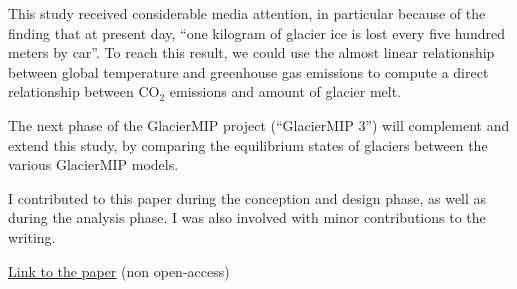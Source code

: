 This study received considerable media attention, in particular because of the finding that at present day,
“one kilogram of glacier ice is lost every five hundred meters by car”. To reach this result, we could use
the almost linear relationship between global temperature and greenhouse gas emissions
to compute a direct relationship between CO\(_2\) emissions and amount of glacier melt.

The next phase of the GlacierMIP project (“GlacierMIP 3”) will complement and extend this study, by comparing
the equilibrium states of glaciers between the various GlacierMIP models.

I contributed to this paper during the conception and design phase, as well as during the
analysis phase. I was also involved with minor contributions to the writing.

\href{https://doi.org/10.1038/s41558-018-0093-1}{Link to the paper} (non open-access)


%

